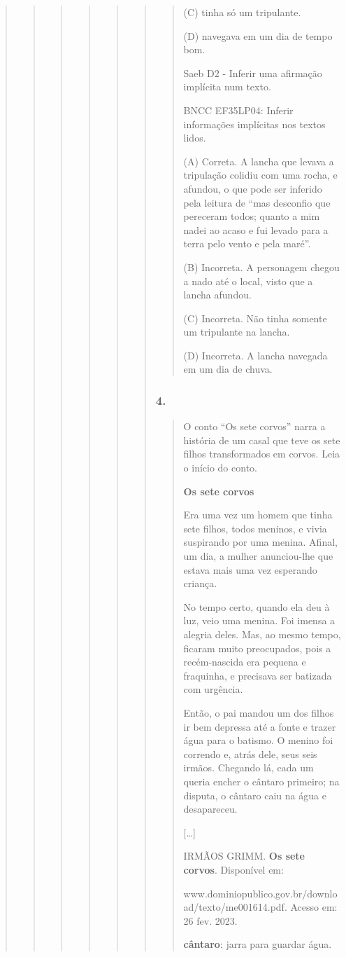 \begin{quote}
\begin{quote}
\begin{quote}
\begin{quote}
\begin{quote}
\begin{quote}
\begin{quote}
(C) tinha só um tripulante.

(D) navegava em um dia de tempo bom.

Saeb D2 - Inferir uma afirmação implícita num texto.

BNCC EF35LP04: Inferir informações implícitas nos textos lidos.

(A) Correta. A lancha que levava a tripulação colidiu com uma rocha, e
afundou, o que pode ser inferido pela leitura de ``mas desconfio que
pereceram todos; quanto a mim nadei ao acaso e fui levado para a terra
pelo vento e pela maré''.

(B) Incorreta. A personagem chegou a nado até o local, visto que a
lancha afundou.

(C) Incorreta. Não tinha somente um tripulante na lancha.

(D) Incorreta. A lancha navegada em um dia de chuva.
\end{quote}

\subsubsection{4. }\label{section-83}

\begin{quote}
O conto ``Os sete corvos'' narra a história de um casal que teve os sete
filhos transformados em corvos. Leia o início do conto.

\textbf{Os sete corvos}

Era uma vez um homem que tinha sete filhos, todos meninos, e vivia
suspirando por uma menina. Afinal, um dia, a mulher anunciou-lhe que
estava mais uma vez esperando criança.

No tempo certo, quando ela deu à luz, veio uma menina. Foi imensa a
alegria deles. Mas, ao mesmo tempo, ficaram muito preocupados, pois a
recém-nascida era pequena e fraquinha, e precisava ser batizada com
urgência.

Então, o pai mandou um dos filhos ir bem depressa até a fonte e trazer
água para o batismo. O menino foi correndo e, atrás dele, seus seis
irmãos. Chegando lá, cada um queria encher o cântaro primeiro; na
disputa, o cântaro caiu na água e desapareceu.

{[}\ldots{}{]}

IRMÃOS GRIMM. \textbf{Os sete corvos}. Disponível em:

www.dominiopublico.gov.br/download/texto/me001614.pdf. Acesso em: 26
fev. 2023.

\textbf{cântaro}: jarra para guardar água.


\end{quote}
\end{quote}
\end{quote}
\end{quote}
\end{quote}
\end{quote}
\end{quote}

